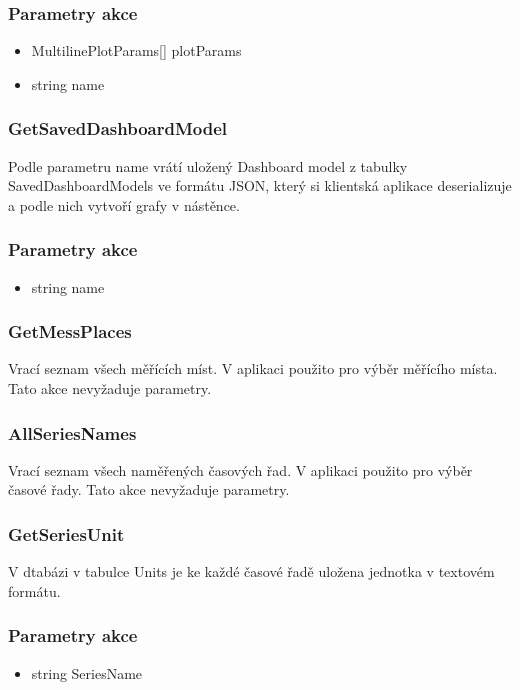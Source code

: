 \documentclass[FM,BP]{tulthesis}
\begin{document}
            \subsubsection*{Parametry akce}
            \begin{itemize}
                \item MultilinePlotParams[] plotParams
                \item string name 
            \end{itemize}

        \subsubsection*{GetSavedDashboardModel}
            Podle parametru name vrátí uložený Dashboard model z tabulky SavedDashboardModels ve formátu JSON, 
            který si klientská aplikace deserializuje a podle nich vytvoří grafy v nástěnce.
            \subsubsection*{Parametry akce}
            \begin{itemize}
                \item string name 
            \end{itemize}

        \subsubsection{GetMessPlaces}
            Vrací seznam všech měřících míst. V aplikaci použito pro výběr měřícího místa. Tato akce nevyžaduje parametry.

        \subsubsection*{AllSeriesNames}
            Vrací seznam všech naměřených časových řad. V aplikaci použito pro výběr časové řady. Tato akce nevyžaduje parametry.

        \subsubsection*{GetSeriesUnit}
            V dtabázi v tabulce Units je ke každé časové řadě uložena jednotka v textovém formátu. 
            \subsubsection*{Parametry akce}
            \begin{itemize}
                \item string SeriesName
            \end{itemize}
\end{document}
